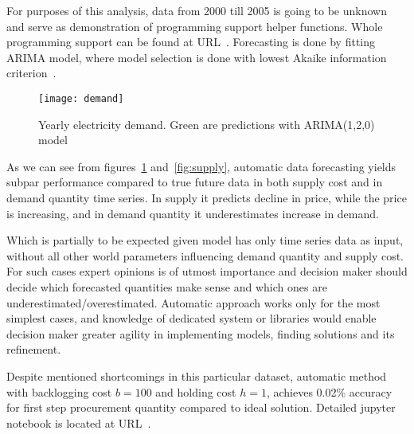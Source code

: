 For purposes of this analysis, data from 2000 till 2005 is going to be unknown and serve as demonstration of programming support helper functions. Whole programming support can be found at URL~\cite{code}. Forecasting is done by fitting ARIMA model, where model selection is done with lowest Akaike information criterion~\cite{Akaike1974}.

\begin{figure}[]
  \centering
  \texttt{[image: demand]}
  \caption{Yearly electricity demand. Green are predictions with ARIMA(1,2,0) model}
  \label{fig:demand}
\end{figure}

As we can see from figures~\ref{fig:demand} and~\ref{fig:supply}, automatic data forecasting yields subpar performance compared to true future data in both supply cost and in demand quantity time series. In supply it predicts decline in price, while the price is increasing, and in demand quantity it underestimates increase in demand.

Which is partially to be expected given model has only time series data as input, without all other world parameters influencing demand quantity and supply cost. For such cases expert opinions is of utmost importance and decision maker should decide which forecasted quantities make sense and which ones are underestimated/overestimated. Automatic approach works only for the most simplest cases, and knowledge of dedicated system or libraries would enable decision maker greater agility in implementing models, finding solutions and its refinement.

Despite mentioned shortcomings in this particular dataset, automatic method with backlogging cost $b=100$ and holding cost $h=1$, achieves 0.02\% accuracy for first step procurement quantity compared to ideal solution. Detailed jupyter notebook is located at URL~\cite{jup}.
